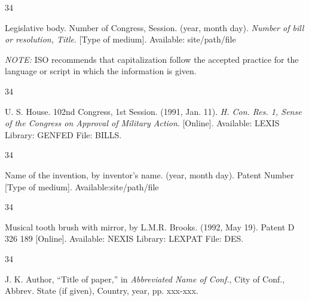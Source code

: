 \documentclass{IEEEojcsys}
\begin{document}
\vspace*{-12pt}
\begin{thebibliography}{34}
\item[]\hskip-18pt Legislative body. Number of Congress, Session. (year, month day). {\em Number of bill or resolution, Title}. [Type of medium]. Available: site/path/file

\item[]\hskip-18pt {\em NOTE:} ISO recommends that capitalization follow the accepted practice for the language or script in which the information is given.
\end{thebibliography}\vspace*{-11pt}

\vspace*{-12pt}

\begin{thebibliography}{34}
\setcounter{enumiv}{19}

\bibitem{}U. S. House. 102nd Congress, 1st Session. (1991, Jan. 11). {\em H. Con. Res. 1, Sense of the Congress on Approval of Military Action}. [Online]. Available: LEXIS Library: GENFED File: BILLS. 
\end{thebibliography}\vskip-13pt

\vspace*{-12pt}
\begin{thebibliography}{34}
\item[]\hskip-18pt Name of the invention, by inventor's name. (year, month day). Patent Number [Type of medium]. Available:site/path/file
\end{thebibliography}\vspace*{-11pt}


\vspace*{-12pt}

\begin{thebibliography}{34}
\setcounter{enumiv}{20}

\bibitem{}Musical tooth brush with mirror, by L.M.R. Brooks. (1992, May 19). Patent D 326 189
[Online]. Available: NEXIS Library: LEXPAT File:   DES. 
\end{thebibliography}\vspace*{-3pt}


\vspace*{-12pt}
\begin{thebibliography}{34}
\item[]\hskip-18pt J. K. Author, ``Title of paper,'' in {\em Abbreviated Name of Conf.}, City of Conf., Abbrev. State (if given), Country, year, pp. xxx-\break xxx.
\end{thebibliography}
\end{document}
